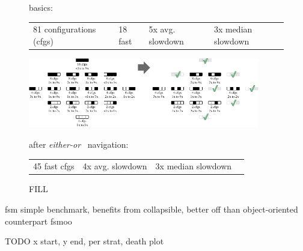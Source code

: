 
\begin{figure}[t]

     basics:
    \begin{tabular}{llll}
      81 configurations (cfgs) &
      18 fast &
      5x avg. slowdown &
      3x median slowdown
    \end{tabular}

    \bigskip

    \includegraphics[width=0.9\textwidth]{data/fsm-lattice.pdf}

    after \emph{either-or}~\cite{g-deep-shallow} navigation:
    \begin{tabular}{llll}
      45 fast cfgs &
      4x avg. slowdown &
      3x median slowdown
    \end{tabular}

  \caption{FILL}
  \label{f:fsm-seascape}
\end{figure}

fsm simple benchmark,
benefits from collapsible, better off than object-oriented counterpart fsmoo



TODO x start, y end, per strat, death plot

